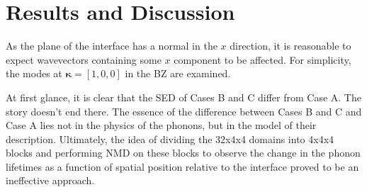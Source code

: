 \documentclass{article}
\begin{document}
\section*{Results and Discussion}
As the plane of the interface has a normal in the $x$ direction, it is reasonable to expect wavevectors containing some $x$ component to be affected. For simplicity, the modes at $\pmb{\kappa}=[1,0,0]$ in the BZ are examined. 
\begin{figure}[h!]
\centering
{}
\end{figure}
At first glance, it is clear that the SED of Cases B and C differ from Case A. The story doesn't end there. The essence of the difference between Cases B and C and Case A lies not in the physics of the phonons, but in the model of their description. Ultimately, the idea of dividing the 32x4x4 domains into 4x4x4 blocks and performing NMD on these blocks to observe the change in the phonon lifetimes as a function of spatial position relative to the interface proved to be an ineffective approach.
\end{document}
